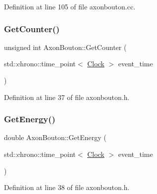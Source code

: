 Definition at line 105 of file axonbouton.\+cc.

\mbox{\label{class_axon_bouton_a251fc23f754c077cf43ee68991b81624}} 
\subsubsection{\texorpdfstring{Get\+Counter()}{GetCounter()}}
{\footnotesize\ttfamily unsigned int Axon\+Bouton\+::\+Get\+Counter (\begin{DoxyParamCaption}\item[{std\+::chrono\+::time\+\_\+point$<$ \mbox{\hyperlink{universe_8h_a0ef8d951d1ca5ab3cfaf7ab4c7a6fd80}{Clock}} $>$}]{event\+\_\+time }\end{DoxyParamCaption})\hspace{0.3cm}{\ttfamily [inline]}}



Definition at line 37 of file axonbouton.\+h.

\mbox{\label{class_axon_bouton_a8dff077a40565f4e3a34388a6c38a603}} 
\subsubsection{\texorpdfstring{Get\+Energy()}{GetEnergy()}}
{\footnotesize\ttfamily double Axon\+Bouton\+::\+Get\+Energy (\begin{DoxyParamCaption}\item[{std\+::chrono\+::time\+\_\+point$<$ \mbox{\hyperlink{universe_8h_a0ef8d951d1ca5ab3cfaf7ab4c7a6fd80}{Clock}} $>$}]{event\+\_\+time }\end{DoxyParamCaption})\hspace{0.3cm}{\ttfamily [inline]}}



Definition at line 38 of file axonbouton.\+h.

\mbox{\label{class_axon_bouton_a847ab3d3d214ddc85bdfd463c6d95d54}} 
